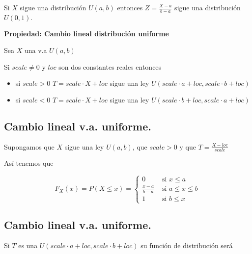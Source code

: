 \documentclass[]{book}
\providecommand{\tightlist}{%
  \setlength{\itemsep}{0pt}\setlength{\parskip}{0pt}}
\begin{document}
Si \(X\) sigue una distribución \(U(a,b)\) entonces \(Z=\frac{X-a}{b-a}\) sigue una distribución \(U(0,1)\).

\textbf{Propiedad: Cambio lineal distribución uniforme}

Sea \(X\) una v.a \(U(a,b)\)

Si \(scale\not=0\) y \(loc\) son dos constantes reales entonces

\begin{itemize}
\tightlist
\item
  si \(scale>0\) \(T=scale\cdot X+loc\) sigue una ley \(U(scale\cdot a +loc,scale\cdot b +loc)\)\\
\item
  si \(scale<0\) \(T=scale\cdot X+loc\) sigue una ley \(U(scale\cdot b +loc,scale\cdot a +loc)\)
\end{itemize}

\hypertarget{cambio-lineal-v.a.-uniforme.-1}{%
\subsection{Cambio lineal v.a. uniforme.}\label{cambio-lineal-v.a.-uniforme.-1}}

Supongamos que \(X\) sigue una ley \(U(a,b)\), que \(scale>0\) y que \(T=\frac{X-loc}{scale}\)

Así tenemos que

\[
F_X(x)=P(X\leq x)=\left\{\begin{array}{ll} 0 & \mbox{ si } x\leq a\\\frac{x-a}{b-a} & \mbox{ si } a\leq x\leq b \\1 & \mbox{ si } b\leq x\end{array}\right.
\]

\hypertarget{cambio-lineal-v.a.-uniforme.-2}{%
\subsection{Cambio lineal v.a. uniforme.}\label{cambio-lineal-v.a.-uniforme.-2}}

Si \(T\) es una \(U(scale\cdot a +loc,scale\cdot b +loc)\) su función de distribución será
\end{document}
